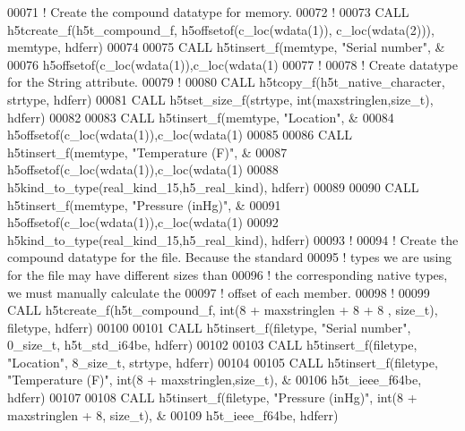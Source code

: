 \begin{DoxyCode}
00071   \textcolor{comment}{! Create the compound datatype for memory.}
00072   \textcolor{comment}{!}
00073   \textcolor{keyword}{CALL }h5tcreate\_f(h5t\_compound\_f, h5offsetof(c\_loc(wdata(1)), c\_loc(wdata(2))), memtype, hdferr)
00074   
00075   \textcolor{keyword}{CALL }h5tinsert\_f(memtype, \textcolor{stringliteral}{"Serial number"}, &
00076        h5offsetof(c\_loc(wdata(1)),c\_loc(wdata(1)%
00077   \textcolor{comment}{!}
00078   \textcolor{comment}{! Create datatype for the String attribute.}
00079   \textcolor{comment}{!}
00080   \textcolor{keyword}{CALL }h5tcopy\_f(h5t\_native\_character, strtype, hdferr)
00081   \textcolor{keyword}{CALL }h5tset\_size\_f(strtype, int(maxstringlen,size\_t), hdferr)  
00082 
00083   \textcolor{keyword}{CALL }h5tinsert\_f(memtype, \textcolor{stringliteral}{"Location"}, &
00084        h5offsetof(c\_loc(wdata(1)),c\_loc(wdata(1)%
00085 
00086   \textcolor{keyword}{CALL }h5tinsert\_f(memtype, \textcolor{stringliteral}{"Temperature (F)"}, &
00087        h5offsetof(c\_loc(wdata(1)),c\_loc(wdata(1)%
00088        h5kind\_to\_type(real\_kind\_15,h5\_real\_kind), hdferr)
00089 
00090   \textcolor{keyword}{CALL }h5tinsert\_f(memtype, \textcolor{stringliteral}{"Pressure (inHg)"}, &
00091        h5offsetof(c\_loc(wdata(1)),c\_loc(wdata(1)%
00092        h5kind\_to\_type(real\_kind\_15,h5\_real\_kind), hdferr)
00093   \textcolor{comment}{!}
00094   \textcolor{comment}{! Create the compound datatype for the file.  Because the standard}
00095   \textcolor{comment}{! types we are using for the file may have different sizes than}
00096   \textcolor{comment}{! the corresponding native types, we must manually calculate the}
00097   \textcolor{comment}{! offset of each member.}
00098   \textcolor{comment}{!}
00099   \textcolor{keyword}{CALL }h5tcreate\_f(h5t\_compound\_f, int(8 + maxstringlen + 8 + 8 , size\_t), filetype, hdferr)
00100   
00101   \textcolor{keyword}{CALL }h5tinsert\_f(filetype, \textcolor{stringliteral}{"Serial number"}, 0\_size\_t, h5t\_std\_i64be, hdferr)
00102 
00103   \textcolor{keyword}{CALL }h5tinsert\_f(filetype, \textcolor{stringliteral}{"Location"}, 8\_size\_t, strtype, hdferr)
00104 
00105   \textcolor{keyword}{CALL }h5tinsert\_f(filetype, \textcolor{stringliteral}{"Temperature (F)"}, int(8 + maxstringlen,size\_t), &
00106        h5t\_ieee\_f64be, hdferr)
00107 
00108   \textcolor{keyword}{CALL }h5tinsert\_f(filetype, \textcolor{stringliteral}{"Pressure (inHg)"}, int(8 + maxstringlen + 8, size\_t), &
00109        h5t\_ieee\_f64be, hdferr)

\end{DoxyCode}
